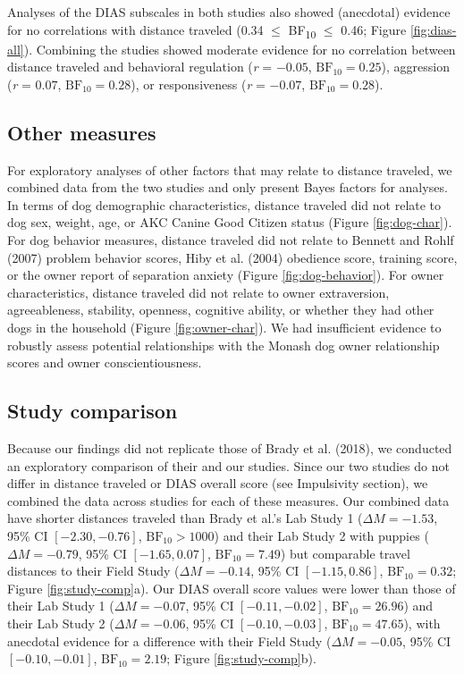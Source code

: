 \documentclass[
  pub,floatsintext]{apa6}
\begin{document}
Analyses of the DIAS subscales in both studies also showed (anecdotal) evidence for no correlations with distance traveled (0.34 \(\leq\) BF\textsubscript{10} \(\leq\) 0.46; Figure \ref{fig:dias-all}). Combining the studies showed moderate evidence for no correlation between distance traveled and behavioral regulation (\emph{r} = \(-0.05\), \(\mathrm{BF}_{\textrm{10}} = 0.25\)), aggression (\emph{r} = \(0.07\), \(\mathrm{BF}_{\textrm{10}} = 0.28\)), or responsiveness (\emph{r} = \(-0.07\), \(\mathrm{BF}_{\textrm{10}} = 0.28\)).

\hypertarget{other-measures}{%
\subsection{Other measures}\label{other-measures}}

For exploratory analyses of other factors that may relate to distance traveled, we combined data from the two studies and only present Bayes factors for analyses. In terms of dog demographic characteristics, distance traveled did not relate to dog sex, weight, age, or AKC Canine Good Citizen status (Figure \ref{fig:dog-char}). For dog behavior measures, distance traveled did not relate to Bennett and Rohlf (2007) problem behavior scores, Hiby et al. (2004) obedience score, training score, or the owner report of separation anxiety (Figure \ref{fig:dog-behavior}). For owner characteristics, distance traveled did not relate to owner extraversion, agreeableness, stability, openness, cognitive ability, or whether they had other dogs in the household (Figure \ref{fig:owner-char}). We had insufficient evidence to robustly assess potential relationships with the Monash dog owner relationship scores and owner conscientiousness.

\hypertarget{study-comparison}{%
\subsection{Study comparison}\label{study-comparison}}

Because our findings did not replicate those of Brady et al. (2018), we conducted an exploratory comparison of their and our studies. Since our two studies do not differ in distance traveled or DIAS overall score (see Impulsivity section), we combined the data across studies for each of these measures. Our combined data have shorter distances traveled than Brady et al.'s Lab Study 1 (\(\Delta M = -1.53\), 95\% CI \([-2.30, -0.76]\), \(\mathrm{BF}_{\textrm{10}} > 1000\)) and their Lab Study 2 with puppies (\(\Delta M = -0.79\), 95\% CI \([-1.65, 0.07]\), \(\mathrm{BF}_{\textrm{10}} = 7.49\)) but comparable travel distances to their Field Study (\(\Delta M = -0.14\), 95\% CI \([-1.15, 0.86]\), \(\mathrm{BF}_{\textrm{10}} = 0.32\); Figure \ref{fig:study-comp}a). Our DIAS overall score values were lower than those of their Lab Study 1 (\(\Delta M = -0.07\), 95\% CI \([-0.11, -0.02]\), \(\mathrm{BF}_{\textrm{10}} = 26.96\)) and their Lab Study 2 (\(\Delta M = -0.06\), 95\% CI \([-0.10, -0.03]\), \(\mathrm{BF}_{\textrm{10}} = 47.65\)), with anecdotal evidence for a difference with their Field Study (\(\Delta M = -0.05\), 95\% CI \([-0.10, -0.01]\), \(\mathrm{BF}_{\textrm{10}} = 2.19\); Figure \ref{fig:study-comp}b).
\end{document}
